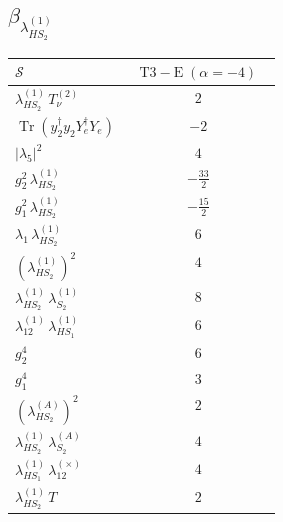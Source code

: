 \documentclass[9pt]{article}
\begin{document}
\subsection*{$ \beta_{\lambda_{HS_2}^{(1)}} $}
\begin{longtable}{@{}p{0.31\linewidth}c@{}}
\toprule
$\mathcal{S}$ & $ \mathrm{T3-E}\;(\alpha=-4) $ \\
\midrule
$ \lambda_{HS_2}^{(1)}\,T_{\nu}^{(2)} $ & $ 2 $ \\
$ \operatorname{Tr}(y_2^\dagger y_2Y_e^\dagger Y_e) $ & $ -2 $ \\
$ |\lambda_5|^2 $ & $ 4 $ \\
$ g_2^2\,\lambda_{HS_2}^{(1)} $ & $ - \frac{33}{2} $ \\
$ g_1^2\,\lambda_{HS_2}^{(1)} $ & $ - \frac{15}{2} $ \\
$ \lambda_1\,\lambda_{HS_2}^{(1)} $ & $ 6 $ \\
$ \left(\lambda_{HS_2}^{(1)}\right)^2 $ & $ 4 $ \\
$ \lambda_{HS_2}^{(1)}\,\lambda_{S_2}^{(1)} $ & $ 8 $ \\
$ \lambda_{12}^{(1)}\,\lambda_{HS_1}^{(1)} $ & $ 6 $ \\
$ g_2^4 $ & $ 6 $ \\
$ g_1^4 $ & $ 3 $ \\
$ \left(\lambda_{HS_2}^{(A)}\right)^2 $ & $ 2 $ \\
$ \lambda_{HS_2}^{(1)}\,\lambda_{S_2}^{(A)} $ & $ 4 $ \\
$ \lambda_{HS_1}^{(1)}\,\lambda_{12}^{(\times)} $ & $ 4 $ \\
$ \lambda_{HS_2}^{(1)}\,T $ & $ 2 $ \\
\bottomrule
\end{longtable}
\end{document}
